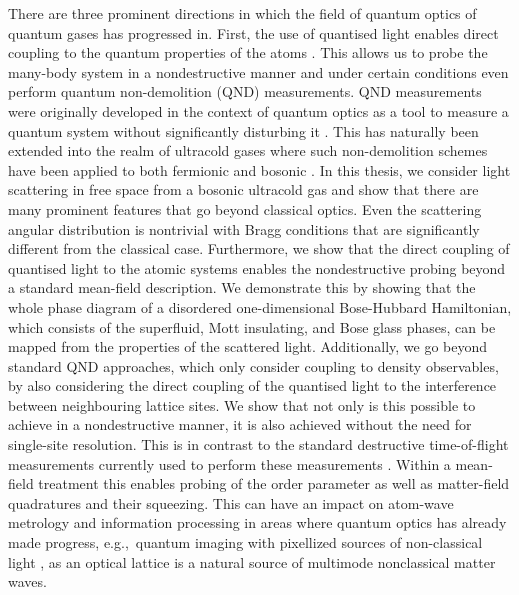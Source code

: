 There are three prominent directions in which the field of quantum
optics of quantum gases has progressed in. First, the use of quantised
light enables direct coupling to the quantum properties of the atoms
\cite{mekhov2007prl, mekhov2007prl, mekhov2012}. This allows us to
probe the many-body system in a nondestructive manner and under
certain conditions even perform quantum non-demolition (QND)
measurements. QND measurements were originally developed in the
context of quantum optics as a tool to measure a quantum system
without significantly disturbing it \cite{braginsky1977, unruh1978,
  brune1990, brune1992}. This has naturally been extended into the
realm of ultracold gases where such non-demolition schemes have been
applied to both fermionic \cite{eckert2008qnd, roscilde2009} and
bosonic \cite{hauke2013, rogers2014}. In this thesis, we consider
light scattering in free space from a bosonic ultracold gas and show
that there are many prominent features that go beyond classical
optics. Even the scattering angular distribution is nontrivial with
Bragg conditions that are significantly different from the classical
case. Furthermore, we show that the direct coupling of quantised light
to the atomic systems enables the nondestructive probing beyond a
standard mean-field description. We demonstrate this by showing that
the whole phase diagram of a disordered one-dimensional Bose-Hubbard
Hamiltonian, which consists of the superfluid, Mott insulating, and
Bose glass phases, can be mapped from the properties of the scattered
light. Additionally, we go beyond standard QND approaches, which only
consider coupling to density observables, by also considering the
direct coupling of the quantised light to the interference between
neighbouring lattice sites. We show that not only is this possible to
achieve in a nondestructive manner, it is also achieved without the
need for single-site resolution. This is in contrast to the standard
destructive time-of-flight measurements currently used to perform
these measurements \cite{miyake2011}. Within a mean-field treatment
this enables probing of the order parameter as well as matter-field
quadratures and their squeezing. This can have an impact on atom-wave
metrology and information processing in areas where quantum optics has
already made progress, e.g.,~quantum imaging with pixellized sources
of non-classical light \cite{golubev2010, kolobov1999}, as an optical
lattice is a natural source of multimode nonclassical matter waves.


